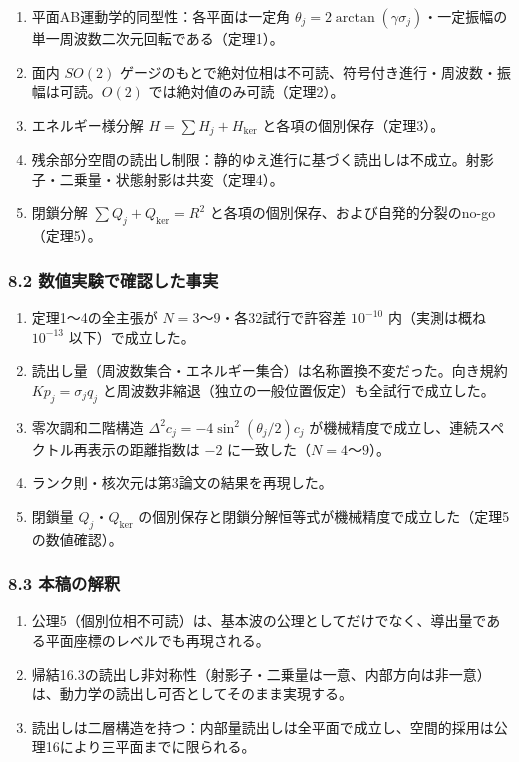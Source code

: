 \documentclass[
  a4paper,
]{ltjsarticle}
\providecommand{\tightlist}{%
  \setlength{\itemsep}{0pt}\setlength{\parskip}{0pt}}
\begin{document}
\begin{enumerate}
\def\labelenumi{\arabic{enumi}.}
\tightlist
\item
  平面AB運動学的同型性：各平面は一定角
  \(\theta_j=2\arctan(\gamma\sigma_j)\)・一定振幅の単一周波数二次元回転である（定理1）。
\item
  面内 \(SO(2)\)
  ゲージのもとで絶対位相は不可読、符号付き進行・周波数・振幅は可読。\(O(2)\)
  では絶対値のみ可読（定理2）。
\item
  エネルギー様分解 \(H=\sum H_j+H_{\ker}\) と各項の個別保存（定理3）。
\item
  残余部分空間の読出し制限：静的ゆえ進行に基づく読出しは不成立。射影子・二乗量・状態射影は共変（定理4）。
\item
  閉鎖分解 \(\sum Q_j+Q_{\ker}=R^2\)
  と各項の個別保存、および自発的分裂のno-go（定理5）。
\end{enumerate}

\subsubsection{8.2
数値実験で確認した事実}\label{ux6570ux5024ux5b9fux9a13ux3067ux78baux8a8dux3057ux305fux4e8bux5b9f}

\begin{enumerate}
\def\labelenumi{\arabic{enumi}.}
\tightlist
\item
  定理1〜4の全主張が \(N=3\)〜\(9\)・各32試行で許容差 \(10^{-10}\)
  内（実測は概ね \(10^{-13}\) 以下）で成立した。
\item
  読出し量（周波数集合・エネルギー集合）は名称置換不変だった。向き規約
  \(Kp_j=\sigma_jq_j\)
  と周波数非縮退（独立の一般位置仮定）も全試行で成立した。
\item
  零次調和二階構造 \(\Delta^2c_j=-4\sin^2(\theta_j/2)c_j\)
  が機械精度で成立し、連続スペクトル再表示の距離指数は \(-2\)
  に一致した（\(N=4\)〜\(9\)）。
\item
  ランク則・核次元は第3論文の結果を再現した。
\item
  閉鎖量 \(Q_j\)・\(Q_{\ker}\)
  の個別保存と閉鎖分解恒等式が機械精度で成立した（定理5の数値確認）。
\end{enumerate}

\subsubsection{8.3 本稿の解釈}\label{ux672cux7a3fux306eux89e3ux91c8}

\begin{enumerate}
\def\labelenumi{\arabic{enumi}.}
\tightlist
\item
  公理5（個別位相不可読）は、基本波の公理としてだけでなく、導出量である平面座標のレベルでも再現される。
\item
  帰結16.3の読出し非対称性（射影子・二乗量は一意、内部方向は非一意）は、動力学の読出し可否としてそのまま実現する。
\item
  読出しは二層構造を持つ：内部量読出しは全平面で成立し、空間的採用は公理16により三平面までに限られる。
\end{enumerate}
\end{document}
